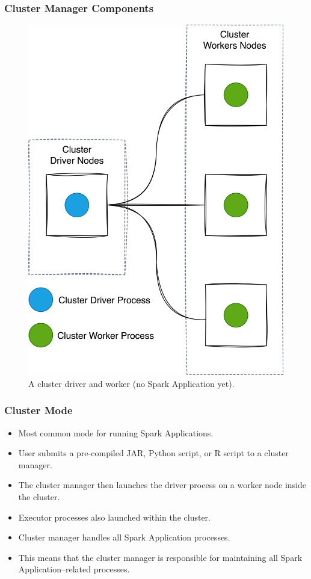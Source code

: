 \begin{frame}
    \frametitle{Cluster Manager Components}
    \begin{figure}
        \includegraphics[width=\textwidth,height=.7\textheight,keepaspectratio]{./Figures/chapter-04/cluster_manager_processes}
        \caption{A cluster driver and worker (no Spark Application yet).}
    \end{figure}
\end{frame}

\begin{frame}
    \frametitle{Cluster Mode}
    \begin{itemize}
        \item Most common mode for running Spark Applications. 
        \item User submits a pre-compiled JAR, Python script, or R script to a cluster manager. 
        \item The cluster manager then launches the driver process on a worker node inside the cluster.
        \item Executor processes also launched within the cluster.
        \item Cluster manager handles all Spark Application processes.
        \item This means that the cluster manager is responsible for maintaining all Spark Application–related processes.
    \end{itemize}
\end{frame}

